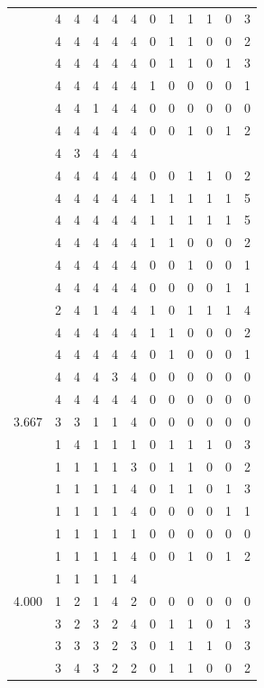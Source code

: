 \documentclass[]{book}
\theoremstyle{definition}
\theoremstyle{definition}
\theoremstyle{definition}
\theoremstyle{remark}
\begin{document}
\begin{table}
{\begin{tabular}[t]{rrrrrrrrrrrr}
 & 4 & 4 & 4 & 4 & 4 & 0 & 1 & 1 & 1 & 0 & 3\\
 & 4 & 4 & 4 & 4 & 4 & 0 & 1 & 1 & 0 & 0 & 2\\
 & 4 & 4 & 4 & 4 & 4 & 0 & 1 & 1 & 0 & 1 & 3\\
 & 4 & 4 & 4 & 4 & 4 & 1 & 0 & 0 & 0 & 0 & 1\\
 & 4 & 4 & 1 & 4 & 4 & 0 & 0 & 0 & 0 & 0 & 0\\
 & 4 & 4 & 4 & 4 & 4 & 0 & 0 & 1 & 0 & 1 & 2\\
 & 4 & 3 & 4 & 4 & 4 &  &  &  &  &  & \\
 & 4 & 4 & 4 & 4 & 4 & 0 & 0 & 1 & 1 & 0 & 2\\
 & 4 & 4 & 4 & 4 & 4 & 1 & 1 & 1 & 1 & 1 & 5\\
 & 4 & 4 & 4 & 4 & 4 & 1 & 1 & 1 & 1 & 1 & 5\\
 & 4 & 4 & 4 & 4 & 4 & 1 & 1 & 0 & 0 & 0 & 2\\
 & 4 & 4 & 4 & 4 & 4 & 0 & 0 & 1 & 0 & 0 & 1\\
 & 4 & 4 & 4 & 4 & 4 & 0 & 0 & 0 & 0 & 1 & 1\\
 & 2 & 4 & 1 & 4 & 4 & 1 & 0 & 1 & 1 & 1 & 4\\
 & 4 & 4 & 4 & 4 & 4 & 1 & 1 & 0 & 0 & 0 & 2\\
 & 4 & 4 & 4 & 4 & 4 & 0 & 1 & 0 & 0 & 0 & 1\\
 & 4 & 4 & 4 & 3 & 4 & 0 & 0 & 0 & 0 & 0 & 0\\
 & 4 & 4 & 4 & 4 & 4 & 0 & 0 & 0 & 0 & 0 & 0\\
3.667 & 3 & 3 & 1 & 1 & 4 & 0 & 0 & 0 & 0 & 0 & 0\\
 & 1 & 4 & 1 & 1 & 1 & 0 & 1 & 1 & 1 & 0 & 3\\
 & 1 & 1 & 1 & 1 & 3 & 0 & 1 & 1 & 0 & 0 & 2\\
 & 1 & 1 & 1 & 1 & 4 & 0 & 1 & 1 & 0 & 1 & 3\\
 & 1 & 1 & 1 & 1 & 4 & 0 & 0 & 0 & 0 & 1 & 1\\
 & 1 & 1 & 1 & 1 & 1 & 0 & 0 & 0 & 0 & 0 & 0\\
 & 1 & 1 & 1 & 1 & 4 & 0 & 0 & 1 & 0 & 1 & 2\\
 & 1 & 1 & 1 & 1 & 4 &  &  &  &  &  & \\
4.000 & 1 & 2 & 1 & 4 & 2 & 0 & 0 & 0 & 0 & 0 & 0\\
 & 3 & 2 & 3 & 2 & 4 & 0 & 1 & 1 & 0 & 1 & 3\\
 & 3 & 3 & 3 & 2 & 3 & 0 & 1 & 1 & 1 & 0 & 3\\
 & 3 & 4 & 3 & 2 & 2 & 0 & 1 & 1 & 0 & 0 & 2\\

\end{tabular}}
\end{table}
\end{document}
